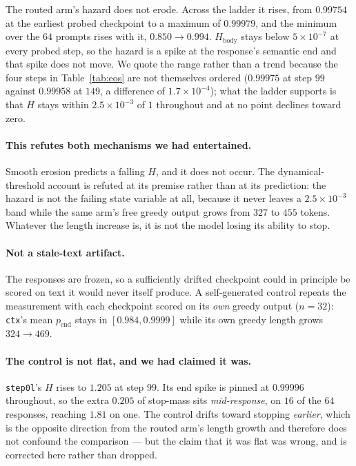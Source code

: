 The routed arm's hazard does not erode. Across the ladder it rises, from $0.99754$ at the
earliest probed checkpoint to a maximum of $0.99979$, and the minimum over the $64$ prompts
rises with it, $0.850 \to 0.994$. $H_{\mathrm{body}}$ stays below $5\times10^{-7}$ at every
probed step, so the hazard is a spike at the response's semantic end and that spike does not
move. We quote the range rather than a trend because the four steps in Table~\ref{tab:eos} are
not themselves ordered ($0.99975$ at step $99$ against $0.99958$ at $149$, a difference of
$1.7\times10^{-4}$); what the ladder supports is that $H$ stays within $2.5\times10^{-3}$ of
$1$ throughout and at no point declines toward zero.

\paragraph{This refutes both mechanisms we had entertained.} Smooth erosion predicts a falling
$H$, and it does not occur. The dynamical-threshold account is refuted at its premise rather
than at its prediction: the hazard is not the failing state variable at all, because it never
leaves a $2.5\times10^{-3}$ band while the same arm's free greedy output grows from $327$ to
$455$ tokens. Whatever the length increase is, it is not the model losing its ability to stop.

\paragraph{Not a stale-text artifact.} The responses are frozen, so a sufficiently drifted
checkpoint could in principle be scored on text it would never itself produce. A
self-generated control repeats the measurement with each checkpoint scored on its \emph{own}
greedy output ($n=32$): \texttt{ctx}'s mean $p_{\mathrm{end}}$ stays in $[0.984, 0.9999]$ while
its own greedy length grows $324 \to 469$.

\paragraph{The control is not flat, and we had claimed it was.} \texttt{step0l}'s $H$ rises to
$1.205$ at step $99$. Its end spike is pinned at $0.99996$ throughout, so the extra $0.205$ of
stop-mass sits \emph{mid-response}, on $16$ of the $64$ responses, reaching $1.81$ on one. The
control drifts toward stopping \emph{earlier}, which is the opposite direction from the routed
arm's length growth and therefore does not confound the comparison --- but the claim that it
was flat was wrong, and is corrected here rather than dropped.

